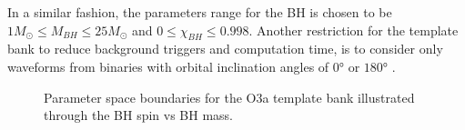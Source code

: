 \documentclass[binding=0.6cm, LaM]{sapthesis}
\begin{document}
       	In a similar fashion, the parameters range for the BH is chosen to be $1M_\odot \leq M_{BH}  \leq 25M_\odot$ and $0 \leq \chi_{BH} \leq 0.998$.
	Another restriction for the template bank to reduce background triggers and computation time, 
	is to consider only waveforms from binaries with orbital inclination angles of $\ang{0}$ or $\ang{180}$ \cite{46}. 
		\begin{figure}[H]
                        \noindent
                        \label{banktest}
                        \centering
                        \caption{Parameter space boundaries for the O3a template bank illustrated through the BH spin vs BH mass.}
                        \label{fig:banktest}
                \end{figure}
\end{document}
